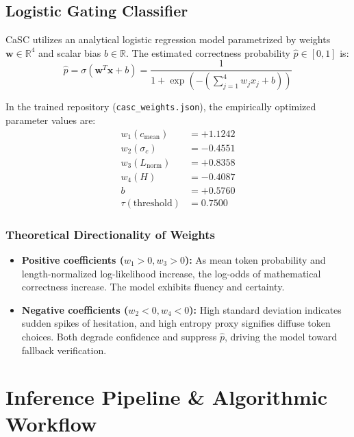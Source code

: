 \documentclass[11pt,a4paper]{article}
\begin{document}
\subsection{Logistic Gating Classifier}
CaSC utilizes an analytical logistic regression model parametrized by weights $\mathbf{w} \in \mathbb{R}^4$ and scalar bias $b \in \mathbb{R}$. The estimated correctness probability $\hat{p} \in [0, 1]$ is:
\begin{equation}
    \hat{p} = \sigma\left(\mathbf{w}^T \mathbf{x} + b\right) = \frac{1}{1 + \exp\left(-\left(\sum_{j=1}^4 w_j x_j + b\right)\right)}
\end{equation}

In the trained repository (\texttt{casc\_weights.json}), the empirically optimized parameter values are:
\begin{equation}
\begin{aligned}
    w_1 (c_{\text{mean}}) &= +1.1242 \\
    w_2 (\sigma_c)        &= -0.4551 \\
    w_3 (L_{\text{norm}}) &= +0.8358 \\
    w_4 (H)               &= -0.4087 \\
    b                     &= +0.5760 \\
    \tau (\text{threshold}) &= 0.7500
\end{aligned}
\end{equation}

\subsubsection{Theoretical Directionality of Weights}
\begin{itemize}[leftmargin=*]
    \item \textbf{Positive coefficients ($w_1 > 0, w_3 > 0$):} As mean token probability and length-normalized log-likelihood increase, the log-odds of mathematical correctness increase. The model exhibits fluency and certainty.
    \item \textbf{Negative coefficients ($w_2 < 0, w_4 < 0$):} High standard deviation indicates sudden spikes of hesitation, and high entropy proxy signifies diffuse token choices. Both degrade confidence and suppress $\hat{p}$, driving the model toward fallback verification.
\end{itemize}

\section{Inference Pipeline \& Algorithmic Workflow}
\end{document}
